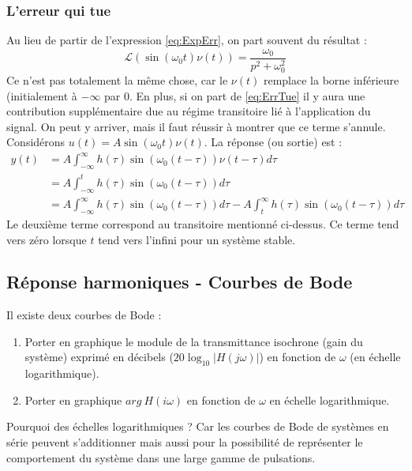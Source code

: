 		\subsubsection{L'erreur qui tue}
		Au lieu de partir de l'expression \autoref{eq:ExpErr}, on part souvent du résultat : 
		\begin{equation}
		\mathcal{L}(\sin(\omega_0t)\nu(t)) = \frac{\omega_0}{p^2+\omega_0^2}
		\label{eq:ErrTue}
		\end{equation}
		Ce n'est pas totalement la même chose, car le $\nu(t)$ remplace la borne inférieure 
		(initialement à $-\infty$ par 0. En plus, si on part de \autoref{eq:ErrTue} il y 
		aura une contribution supplémentaire due au régime transitoire lié à l'application du
		signal. On peut y arriver, mais il faut réussir à montrer que ce terme s'annule.\\
		Considérons $u(t) = A\sin(\omega_0t)\nu(t)$. La réponse (ou sortie) est :
		\begin{equation}
		\begin{array}{ll}
		y(t) &= A\int_{-\infty}^\infty h(\tau)\sin(\omega_0(t-\tau))\nu(t-\tau)d\tau\\
		 &= A\int_{-\infty}^t h(\tau)\sin(\omega_0(t-\tau))d\tau \\
		 &= A\int_{-\infty}^\infty h(\tau)\sin(\omega_0(t-\tau))d\tau - A\int_{t}^\infty
		 h(\tau)\sin(\omega_0(t-\tau))d\tau
		\end{array}
		\end{equation}
		Le deuxième terme correspond au transitoire mentionné ci-dessus. Ce terme tend vers
		zéro lorsque $t$ tend vers l'infini pour un système stable.


	
	\subsection{Réponse harmoniques - Courbes de Bode}
	Il existe deux courbes de Bode :
	\begin{enumerate}
	\item Porter en graphique le module de la transmittance isochrone (gain du système) exprimé 
	en décibels ($20\log_10|H(j\omega)|$) en fonction de $\omega$ (en échelle logarithmique).
	\item Porter en graphique $arg\ H(i\omega)$ en fonction de $\omega$ en échelle logarithmique.
	\end{enumerate}
	Pourquoi des échelles logarithmiques ? Car les courbes de Bode de systèmes en série peuvent 
	s'additionner mais aussi pour la possibilité de représenter le comportement du système dans 
	une large gamme de pulsations.\\
	
